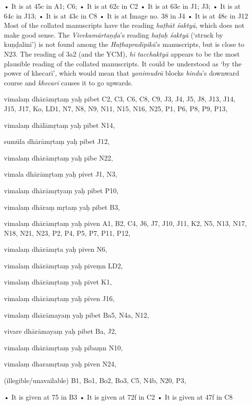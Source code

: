 \begin{marma}[hp03_039]
    \begin{description}
    • It is at 45c in A1; C6;
    • It is at 62c in C2
    • It is at 63c in J1; J3;
    • It is at 64c in J13;
    • It is at 43c in C8
    • It is at Image no. 38 in J4
    • It is at 48c in J12
      Most of the collated manuscripts have the reading \emph{haṭhāt śaktyā}, which does not make good sense. The \emph{Vivekamārtaṇḍa}'s reading \emph{haṭaḥ śaktyā} (`struck by kuṇḍalinī') is not found among the \emph{Haṭhapradīpikā}'s manuscripts, but is close to N23. The reading of 3a2 (and the YCM), \emph{hi tacchaktyā} appears to be the most plausible reading of the collated manuscripts. It could be understood as `by the power of  khecarī', which would mean that \emph{yonimudrā} blocks \emph{bindu}'s downward course and \emph{khecarī} causes it to go upwards.
    \end{description}

\end{marma}

\begin{marma}[hp03_046]


\item[vimalaṃ dhārāmṛtaṃ yaḥ pibet] C2, C3, C6, C8, C9, J3, J4, J5, J8, J13, J14, J15, J17, Ko, LD1, N7, N8, N9, N11, N15, N16, N25, P1, P6, P8, P9, P13, 
\item[vimalaṃ dhālāmṛtaṃ yaḥ pibet] N14,
\item[sumūla dhārāmṛtaṃ yaḥ pibet] J12,
\item[vimalaṃ dhārāmṛtaṃ yaḥ pībe] N22,
\item[vimala dhārāmṛtaṃ yaḥ pivet] J1, N3, 
\item[vimalaṃ dhārāmṛtyaṃ yaḥ pibet] P10,
\item[vimalaṃ dhāraṃ mṛtaṃ yaḥ pibet] B3, 
\item[vimalaṃ dhārāmṛtaṃ yaḥ piven] A1, B2, C4, J6, J7, J10, J11, K2, N5, N13, N17, N18, N21, N23, P2, P4, P5, P7, P11, P12, 
\item[vimalaṃ dhārāmṛta yaḥ piven] N6,
\item[vimalaṃ dhārāmṛtaṃ yaḥ piveṃn] LD2,
\item[vimalaṃ dhārāmṛtaṃ yaḥ pīvet] K1,
\item[vimalaṃ dhārāmṛtaṃ yaḥ pīven] J16,
\item[vimalaṃ dhārāmayaṃ yaḥ pibet] Ba5, N4a, N12, 
\item[vivare dhārāmayaṃ yaḥ pibet] Ba, J2, 
\item[vimalaṃ dhārāmṛtaṃ yaḥ pibaṃn] N10,
\item[vimalaṃ dharamṛtaṃ yaḥ piven] N24,
\item[(illegible/unavailable)] B1, Bo1, Bo2, Bo3, C5, N4b, N20, P3, 

  \begin{description}
    • It is given at 75 in B3
    • It is given at 72f in C2
    • It is given at 47f in C8
    \end{description}

\end{marma}

